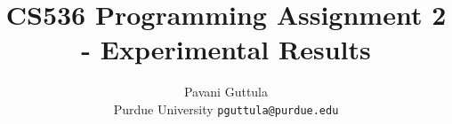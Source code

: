 \documentclass[preprint,9pt]{article}
\date{}
\begin{document}
\title{CS536 Programming Assignment 2 - Experimental Results}

\author{Pavani Guttula\\ \small{Purdue University} \hspace*{0.1in}
  \small{{\tt pguttula@purdue.edu}} }

\maketitle




{
}
\end{document}
